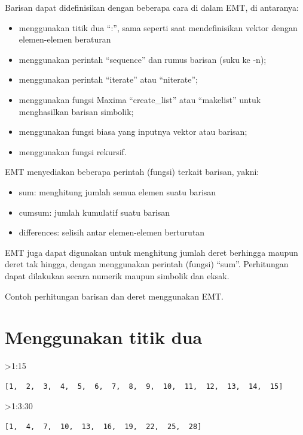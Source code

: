 \documentclass[
]{book}
\begin{document}
Barisan dapat didefinisikan dengan beberapa cara di dalam EMT, di antaranya:

\begin{itemize}
\item
  menggunakan titik dua ``:'', sama seperti saat mendefinisikan vektor dengan elemen-elemen beraturan
\item
  menggunakan perintah ``sequence'' dan rumus barisan (suku ke -n);
\item
  menggunakan perintah ``iterate'' atau ``niterate'';
\item
  menggunakan fungsi Maxima ``create\_list'' atau ``makelist'' untuk menghasilkan barisan simbolik;
\item
  menggunakan fungsi biasa yang inputnya vektor atau barisan;
\item
  menggunakan fungsi rekursif.
\end{itemize}

EMT menyediakan beberapa perintah (fungsi) terkait barisan, yakni:

\begin{itemize}
\item
  sum: menghitung jumlah semua elemen suatu barisan
\item
  cumsum: jumlah kumulatif suatu barisan
\item
  differences: selisih antar elemen-elemen berturutan
\end{itemize}

EMT juga dapat digunakan untuk menghitung jumlah deret berhingga maupun deret tak hingga, dengan menggunakan perintah (fungsi) ``sum''. Perhitungan dapat dilakukan secara numerik maupun simbolik dan eksak.

Contoh perhitungan barisan dan deret menggunakan EMT.

\section{Menggunakan titik dua}\label{menggunakan-titik-dua}

\textgreater1:15

\begin{verbatim}
[1,  2,  3,  4,  5,  6,  7,  8,  9,  10,  11,  12,  13,  14,  15]
\end{verbatim}

\textgreater1:3:30

\begin{verbatim}
[1,  4,  7,  10,  13,  16,  19,  22,  25,  28]
\end{verbatim}
\end{document}
